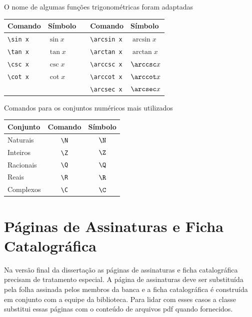 \documentclass[fleqn]{icat-ufal}
\begin{document}
O nome de algumas funções trigonométricas foram adaptadas
\begin{center}
    \begin{tabular}{llcll}
    	\hline
    	Comando            & Símbolo  & \null\hspace{2cm}\null & Comando               & Símbolo     \\ \hline
    	\lstinline!\sin x! & $\sin x$ &                        & \lstinline!\arcsin x! & $\arcsin x$ \\
    	\lstinline!\tan x! & $\tan x$ &                        & \lstinline!\arctan x! & $\arctan x$ \\
    	\lstinline!\csc x! & $\csc x$ &                        & \lstinline!\arccsc x! & $\arccsc x$ \\
    	\lstinline!\cot x! & $\cot x$ &                        & \lstinline!\arccot x! & $\arccot x$ \\
    	                   &          &                        & \lstinline!\arcsec x! & $\arcsec x$ \\ \hline
    \end{tabular}
\end{center}

Comandos para os conjuntos numéricos mais utilizados
\begin{center}
    \begin{tabular}{lcc}
            \hline
            Conjunto  &    Comando     & Símbolo \\ \hline
            Naturais  & \lstinline!\N! &  $\N$   \\
            Inteiros  & \lstinline!\Z! &  $\Z$   \\
            Racionais & \lstinline!\Q! &  $\Q$   \\
            Reais     & \lstinline!\R! &  $\R$   \\
            Complexos & \lstinline!\C! &  $\C$   \\ \hline
    \end{tabular}
\end{center}

\section{Páginas de Assinaturas e Ficha Catalográfica}
\label{sec:paginas_de_assinatura_e_ficha_catalografica}

Na versão final da dissertação as páginas de assinaturas e ficha catalográfica
precisam de tratamento especial. A página de assinaturas deve ser
substituída pela folha assinada pelos membros da banca e a ficha catalográfica
é construída em conjunto com a equipe da biblioteca.
Para lidar com esses casos a classe substitui essas páginas com o 
conteúdo de arquivos \textsf{pdf} quando fornecidos.
\end{document}
